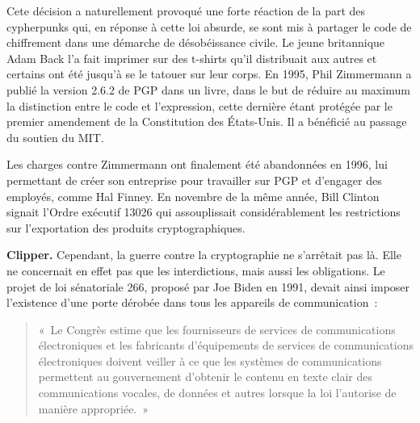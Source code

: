 Cete décision a naturellement provoqué une forte réaction de la part des cypherpunks qui, en réponse à cette loi absurde, se sont mis à partager le code de chiffrement dans une démarche de désobéissance civile. Le jeune britannique Adam Back l'a fait imprimer sur des t-shirts qu'il distribuait aux autres et certains ont été jusqu'à se le tatouer sur leur corps. En 1995, Phil Zimmermann a publié la version 2.6.2 de PGP dans un livre, dans le but de réduire au maximum la distinction entre le code et l'expression, cette dernière étant protégée par le premier amendement de la Constitution des États-Unis. Il a bénéficié au passage du soutien du MIT.

Les charges contre Zimmermann ont finalement été abandonnées en 1996, lui permettant de créer son entreprise pour travailler sur PGP et d'engager des employés, comme Hal Finney. En novembre de la même année, Bill Clinton signait l'Ordre exécutif 13026 qui assouplissait considérablement les restrictions sur l'exportation des produits cryptographiques.

\textbf{Clipper.} Cependant, la guerre contre la cryptographie ne s'arrêtait pas là. Elle ne concernait en effet pas que les interdictions, mais aussi les obligations. Le projet de loi sénatoriale 266, proposé par Joe Biden en 1991, devait ainsi imposer l'existence d'une porte dérobée dans tous les appareils de communication~: %

\begin{quote}
«~Le Congrès estime que les fournisseurs de services de communications électroniques et les fabricants d'équipements de services de communications électroniques doivent veiller à ce que les systèmes de communications permettent au gouvernement d'obtenir le contenu en texte clair des communications vocales, de données et autres lorsque la loi l'autorise de manière appropriée.~»
\end{quote} %


